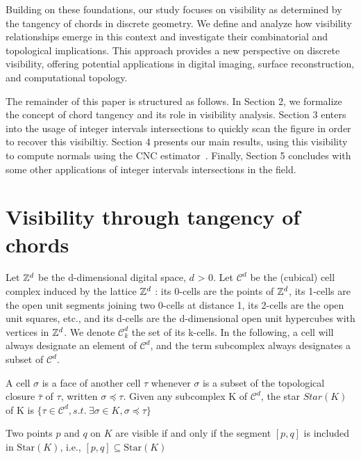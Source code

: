 \documentclass[runningheads]{llncs}
\begin{document}
    Building on these foundations, our study focuses on visibility as determined by the tangency of chords in discrete geometry.
    We define and analyze how visibility relationships emerge in this context and investigate their combinatorial and topological implications.
    This approach provides a new perspective on discrete visibility, offering potential applications in digital imaging, surface reconstruction, and computational topology.

    The remainder of this paper is structured as follows.
    In Section 2, we formalize the concept of chord tangency and its role in visibility analysis.
    Section 3 enters into the usage of integer intervals intersections to quickly scan the figure in order to recover this visibiltiy.
    Section 4 presents our main results, using this visibility to compute normals using the CNC estimator~\cite{lachaud:2022-dcg}.
    Finally, Section 5 concludes with some other applications of integer intervals intersections in the field.




    \section{Visibility through tangency of chords}


    Let $\mathbb{Z}^d$ be the d-dimensional digital space, $d$ > 0.
    Let $\mathcal{C}^d$ be the (cubical) cell complex induced by the lattice $\mathbb{Z}^d$ : its 0-cells are the points of $\mathbb{Z}^d$, its 1-cells are the open unit segments joining two 0-cells at distance 1, its 2-cells are the open unit squares, etc., and its d-cells are the d-dimensional open unit hypercubes with vertices in $\mathbb{Z}^d$.
    We denote $\mathcal{C}^d_k$ the set of its k-cells.
    In the following, a cell will always designate an element of $\mathcal{C}^d$, and the term subcomplex always designates a subset of $\mathcal{C}^d$.

    A cell $\sigma$ is a face of another cell $\tau$ whenever $\sigma$ is a subset of the topological closure $\bar{\tau}$ of $\tau$, written $\sigma \preccurlyeq \tau$.
    Given any subcomplex K of $\mathcal{C}^d$, the star $Star(K)$ of K is $\{\tau \in \mathcal{C}^d, s.t.\ \exists\sigma \in K,\sigma \preccurlyeq \tau\}$

    \begin{definition}
        Two points \( p \) and \( q \) on \( K \) are visible if and only if the segment \([p, q]\) is included in \(\text{Star}(K)\), i.e., \( [p, q] \subseteq \text{Star}(K)\)
    \end{definition}
\end{document}

